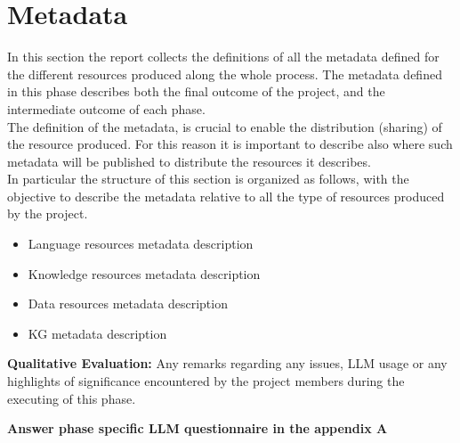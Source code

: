 \section{Metadata}

In this section the report collects the definitions of all the metadata defined for the different resources produced along the whole process. The metadata defined in this phase describes both the final outcome of the project, and the intermediate outcome of each phase.\\

\noindent The definition of the metadata, is crucial to enable the distribution (sharing) of the resource produced. For this reason it is important to describe also where such metadata will be published to distribute the resources it describes. \\

\noindent In particular the structure of this section is organized as follows, with the objective to describe the metadata relative to all the type of resources produced by the project.\\
\begin{itemize}
    \item Language resources metadata description
    \item Knowledge resources metadata description
    \item Data resources metadata description
    \item KG metadata description
\end{itemize}

\noident \textbf{Qualitative Evaluation:} Any remarks regarding any issues, LLM usage or any highlights of significance encountered by the project members during the executing of this phase.

\noident \textbf{Answer phase specific LLM questionnaire in the appendix A}


